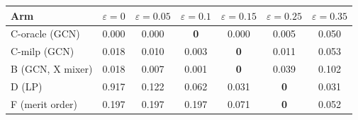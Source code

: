 \begin{tabular}{lcccccc}
\toprule
Arm & $\varepsilon{=}0$ & $\varepsilon{=}0.05$ & $\varepsilon{=}0.1$ & $\varepsilon{=}0.15$ & $\varepsilon{=}0.25$ & $\varepsilon{=}0.35$ \\
\midrule
C-oracle (GCN) & 0.000 & 0.000 & \textbf{0} & 0.000 & 0.005 & 0.050 \\
C-milp (GCN) & 0.018 & 0.010 & 0.003 & \textbf{0} & 0.011 & 0.053 \\
B (GCN, X mixer) & 0.018 & 0.007 & 0.001 & \textbf{0} & 0.039 & 0.102 \\
D (LP) & 0.917 & 0.122 & 0.062 & 0.031 & \textbf{0} & 0.031 \\
F (merit order) & 0.197 & 0.197 & 0.197 & 0.071 & \textbf{0} & 0.052 \\
\bottomrule
\end{tabular}
